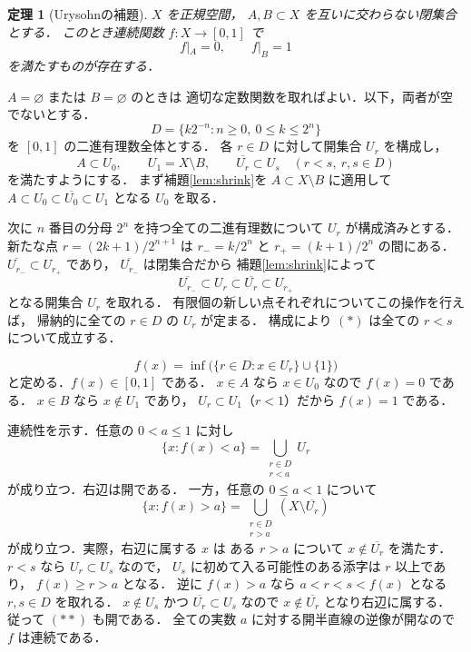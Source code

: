 \documentclass[a5paper,10pt,onecolumn]{jsarticle}
\makeatletter
\theoremstyle{mathnotetheorem}
\newtheorem{theorem}{定理}[section]
\renewcommand{\proofname}{証明}
\renewenvironment{proof}[1][\proofname]{%
  \par\pushQED{\qed}\normalfont\topsep4\p@\@plus2\p@\relax
  \trivlist\item[\hskip\labelsep\bfseries #1]\ignorespaces
}{\popQED\endtrivlist\@endpefalse}
\makeatother
\begin{document}
\begin{theorem}[Urysohnの補題]\label{thm:urysohn}
$X$ を正規空間，
$A,B\subset X$ を互いに交わらない閉集合とする．
このとき連続関数 $f:X\to[0,1]$ で
\[
 f|_A=0,\qquad f|_B=1
\]
を満たすものが存在する．
\end{theorem}
\begin{proof}
$A=\varnothing$ または $B=\varnothing$ のときは
適切な定数関数を取ればよい．以下，両者が空でないとする．
\[
 D=\{k2^{-n}:n\ge0,\ 0\le k\le2^n\}
\]
を $[0,1]$ の二進有理数全体とする．
各 $r\in D$ に対して開集合 $U_r$ を構成し，
\[
 A\subset U_0,\qquad U_1=X\setminus B,\qquad
 \overline{U_r}\subset U_s\quad(r<s,\ r,s\in D)
 \tag{$*$}
\]
を満たすようにする．
まず補題\ref{lem:shrink}を
$A\subset X\setminus B$ に適用して
$A\subset U_0\subset\overline{U_0}\subset U_1$
となる $U_0$ を取る．

次に $n$ 番目の分母 $2^n$ を持つ全ての二進有理数について
$U_r$ が構成済みとする．
新たな点
$r=(2k+1)/2^{n+1}$ は
$r_- =k/2^n$ と $r_+=(k+1)/2^n$ の間にある．
$\overline{U_{r_-}}\subset U_{r_+}$ であり，
$\overline{U_{r_-}}$ は閉集合だから
補題\ref{lem:shrink}によって
\[
 \overline{U_{r_-}}\subset U_r
 \subset\overline{U_r}\subset U_{r_+}
\]
となる開集合 $U_r$ を取れる．
有限個の新しい点それぞれについてこの操作を行えば，
帰納的に全ての $r\in D$ の $U_r$ が定まる．
構成により $(*)$ は全ての $r<s$ について成立する．

\[
 f(x)=\inf\bigl(\{r\in D:x\in U_r\}\cup\{1\}\bigr)
\]
と定める．$f(x)\in[0,1]$ である．
$x\in A$ なら $x\in U_0$ なので $f(x)=0$ である．
$x\in B$ なら $x\notin U_1$ であり，
$U_r\subset U_1$（$r<1$）だから $f(x)=1$ である．

連続性を示す．任意の $0<a\le1$ に対し
\[
 \{x:f(x)<a\}
 =\bigcup_{\substack{r\in D\\r<a}}U_r
\]
が成り立つ．右辺は開である．
一方，任意の $0\le a<1$ について
\[
 \{x:f(x)>a\}
 =\bigcup_{\substack{r\in D\\r>a}}
       (X\setminus\overline{U_r})
 \tag{$**$}
\]
が成り立つ．実際，右辺に属する $x$ は
ある $r>a$ について $x\notin\overline{U_r}$ を満たす．
$r<s$ なら $U_r\subset U_s$ なので，
$U_s$ に初めて入る可能性のある添字は $r$ 以上であり，
$f(x)\ge r>a$ となる．
逆に $f(x)>a$ なら
$a<r<s<f(x)$ となる $r,s\in D$ を取れる．
$x\notin U_s$ かつ
$\overline{U_r}\subset U_s$ なので
$x\notin\overline{U_r}$ となり右辺に属する．
従って $(**)$ も開である．
全ての実数 $a$ に対する開半直線の逆像が開なので
$f$ は連続である．
\end{proof}
\end{document}
